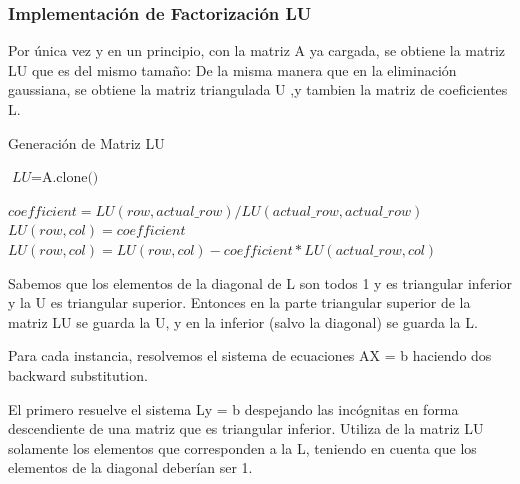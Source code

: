 \subsubsection{Implementación de Factorización LU}

Por única vez y en un principio, con la matriz A ya cargada, se obtiene la matriz LU que es del mismo tamaño:
De la misma manera que en la eliminación gaussiana, se obtiene la matriz triangulada U ,y tambien la matriz de coeficientes L. 

\begin{algorithm}
\caption{Generación de Matriz LU}\label{euclid}
\begin{algorithmic}[1]


    \State $\textit{LU} = \text{A.clone()}$

        \Return
      \EndIf

          \State $coefficient = LU(row, actual\_row) / LU(actual\_row, actual\_row)$
              \State $LU(row,col) = coefficient$
            \Else
              \State $LU(row, col) = LU(row, col) - coefficient * LU(actual\_row, col)$
            \EndIf
          \EndFor

      \EndFor    
    \EndFor

  \EndFunction

\end{algorithmic}
\end{algorithm}


Sabemos que los elementos de la diagonal de L son todos 1 y es triangular inferior y la U es triangular superior. Entonces en la parte triangular superior de la matriz LU se guarda la U, y en la inferior (salvo la diagonal) se guarda la L.

Para cada instancia, resolvemos el sistema de ecuaciones AX = b haciendo dos backward substitution. 

El primero resuelve el sistema Ly = b despejando las incógnitas en forma descendiente de una matriz que es triangular inferior. Utiliza de la matriz LU solamente los elementos que corresponden a la L, teniendo en cuenta que los elementos de la diagonal deberían ser 1.


